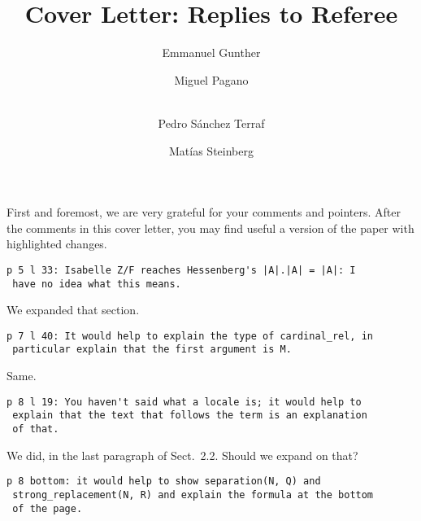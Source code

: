 \documentclass[runningheads]{llncs}
\begin{document}
%
\title{Cover Letter: Replies to Referee
}
%
%
\author{Emmanuel Gunther \and
Miguel Pagano \and \\
Pedro Sánchez Terraf%
\and
Matías Steinberg
}
%
%
%
\maketitle              %
%
First and foremost, we are very grateful
for your comments and pointers. After the comments in this cover
letter, you may find useful a version of the paper with highlighted
changes.

\begin{verbatim}
p 5 l 33: Isabelle Z/F reaches Hessenberg's |A|.|A| = |A|: I
 have no idea what this means.
\end{verbatim}

We expanded that section.

\begin{verbatim}
p 7 l 40: It would help to explain the type of cardinal_rel, in
 particular explain that the first argument is M.
\end{verbatim}

Same.

\begin{verbatim}
p 8 l 19: You haven't said what a locale is; it would help to
 explain that the text that follows the term is an explanation
 of that.
\end{verbatim}

We did, in the last paragraph of Sect.~2.2. Should we expand on
that?

\begin{verbatim}
p 8 bottom: it would help to show separation(N, Q) and
 strong_replacement(N, R) and explain the formula at the bottom
 of the page.
\end{verbatim}
\end{document}

